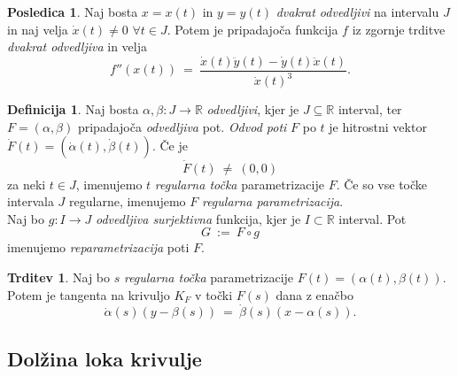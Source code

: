 \documentclass[11pt]{article}
\theoremstyle{definition}
\newtheorem{definicija}{Definicija}[section]
\theoremstyle{definition}
\newtheorem{trditev}{Trditev}[section]
\theoremstyle{definition}
\theoremstyle{theorem}
\newtheorem*{posledica}{Posledica}
\begin{document}
\begin{posledica}

Naj bosta $x = x(t)$ in $y = y(t)$ \textit{dvakrat odvedljivi} na intervalu $J$ in naj velja $\dot{x}(t) \neq 0$ $\forall t \in J$. Potem je pripadajoča funkcija $f$ iz zgornje trditve \textit{dvakrat odvedljiva} in velja
$$f''(x(t)) ~=~ \frac{\dot{x}(t) \ddot{y}(t) - \dot{y}(t) \ddot{x}(t)}{\dot{x}(t)^3}.$$

\end{posledica}
\vspace{0.5cm}

\begin{definicija}

Naj bosta $\alpha, \beta: J \rightarrow \mathbb{R}$ \textit{odvedljivi}, kjer je $J \subseteq \mathbb{R}$ interval, ter $F = (\alpha, \beta)$ pripadajoča \textit{odvedljiva} pot. \textit{Odvod poti} $F$ po $t$ je hitrostni vektor $\dot{F}(t) = (\dot{\alpha}(t), \dot{\beta}(t))$. 
Če je 
$$\dot{F}(t) ~\neq~ (0, 0)$$ 
za neki $t \in J$, imenujemo $t$ \textit{regularna točka} parametrizacije $F$. Če so vse točke intervala $J$ regularne, imenujemo $F$ \textit{regularna parametrizacija}. \\
Naj bo $g: I \rightarrow J$ \textit{odvedljiva surjektivna} funkcija, kjer je $I \subset \mathbb{R}$ interval. Pot
$$G ~:=~ F \circ g$$
imenujemo \textit{reparametrizacija} poti $F$.

\end{definicija}
\vspace{0.5cm}

\begin{trditev}

Naj bo $s$ \textit{regularna točka} parametrizacije $F(t) = (\alpha(t), \beta(t))$. Potem je 
tangenta na krivuljo $K_F$ v točki $F(s)$ dana z enačbo
$$\dot{\alpha}(s)(y - \beta(s)) ~=~ \dot{\beta}(s)(x - \alpha(s)).$$

\end{trditev}
\vspace{0.5cm}


\subsection{Dolžina loka krivulje}
\vspace{0.5cm}
\end{document}
